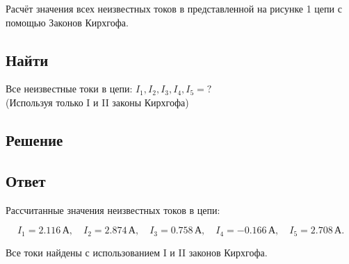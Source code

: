Расчёт значения всех неизвестных токов в представленной на рисунке 1 цепи с помощью Законов Кирхгофа.

\subsection{Найти}
Все неизвестные токи в цепи: \(I_1, I_2, I_3, I_4, I_5 = ?\) \\
(Используя только I и II законы Кирхгофа)

\subsection{Решение}


\subsection{Ответ}

Рассчитанные значения неизвестных токов в цепи:

\[
I_1 = 2.116 \, \text{А}, \quad
I_2 = 2.874 \, \text{А}, \quad
I_3 = 0.758 \, \text{А}, \quad
I_4 = -0.166 \, \text{А}, \quad
I_5 = 2.708 \, \text{А}.
\]

Все токи найдены с использованием I и II законов Кирхгофа.
